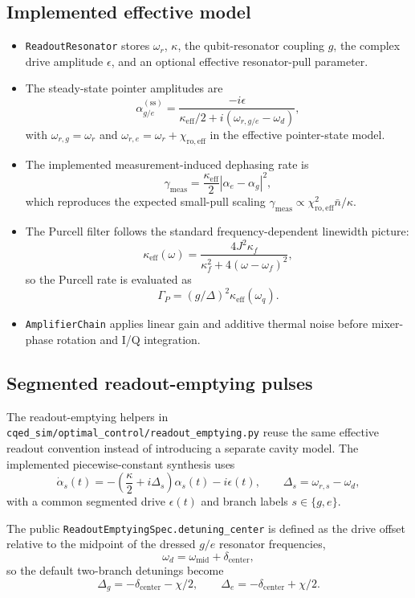\documentclass[11pt]{article}
\begin{document}
\subsection*{Implemented effective model}
\begin{itemize}[leftmargin=1.5em]
  \item \texttt{ReadoutResonator} stores \(\omega_r\), \(\kappa\), the qubit-resonator
  coupling \(g\), the complex drive amplitude \(\epsilon\), and an optional effective
  resonator-pull parameter.
  \item The steady-state pointer amplitudes are
  \[
  \alpha_{g/e}^{(\mathrm{ss})}
  =
  \frac{-i\epsilon}{\kappa_{\mathrm{eff}}/2 + i(\omega_{r,g/e}-\omega_d)},
  \]
  with \(\omega_{r,g}=\omega_r\) and \(\omega_{r,e}=\omega_r+\chi_{\mathrm{ro,eff}}\)
  in the effective pointer-state model.
  \item The implemented measurement-induced dephasing rate is
  \[
  \gamma_{\mathrm{meas}} = \frac{\kappa_{\mathrm{eff}}}{2} |\alpha_e-\alpha_g|^2,
  \]
  which reproduces the expected small-pull scaling
  \(\gamma_{\mathrm{meas}} \propto \chi_{\mathrm{ro,eff}}^2 \bar{n}/\kappa\).
  \item The Purcell filter follows the standard frequency-dependent linewidth picture:
  \[
  \kappa_{\mathrm{eff}}(\omega)
  =
  \frac{4 J^2 \kappa_f}{\kappa_f^2 + 4(\omega-\omega_f)^2},
  \]
  so the Purcell rate is evaluated as
  \[
  \Gamma_P = (g/\Delta)^2 \kappa_{\mathrm{eff}}(\omega_q).
  \]
  \item \texttt{AmplifierChain} applies linear gain and additive thermal noise
  before mixer-phase rotation and I/Q integration.
\end{itemize}

\subsection*{Segmented readout-emptying pulses}
The readout-emptying helpers in
\texttt{cqed\_sim/optimal\_control/readout\_emptying.py} reuse the same effective
readout convention instead of introducing a separate cavity model. The implemented
piecewise-constant synthesis uses
\[
\dot{\alpha}_s(t)
=
-\left(\frac{\kappa}{2} + i \Delta_s\right)\alpha_s(t) - i\epsilon(t),
\qquad
\Delta_s = \omega_{r,s} - \omega_d,
\]
with a common segmented drive \(\epsilon(t)\) and branch labels \(s\in\{g,e\}\).

\noindent
The public \texttt{ReadoutEmptyingSpec.detuning\_center} is defined as the drive
offset relative to the midpoint of the dressed \(g/e\) resonator frequencies,
\[
\omega_d = \omega_{\mathrm{mid}} + \delta_{\mathrm{center}},
\]
so the default two-branch detunings become
\[
\Delta_g = -\delta_{\mathrm{center}} - \chi/2,
\qquad
\Delta_e = -\delta_{\mathrm{center}} + \chi/2.
\]
\end{document}
